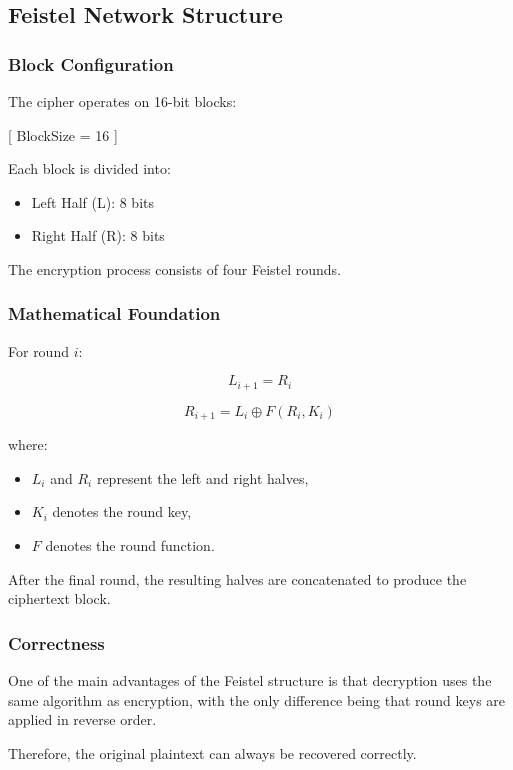 \documentclass[12pt]{article}
\begin{document}
\subsection{Feistel Network Structure}

\subsubsection{Block Configuration}

The cipher operates on 16-bit blocks:

[
BlockSize = 16 
]

Each block is divided into:

\begin{itemize}
\item Left Half (L): 8 bits
\item Right Half (R): 8 bits
\end{itemize}

The encryption process consists of four Feistel rounds.

\subsubsection{Mathematical Foundation}

For round $i$:

\[
L_{i+1}=R_i
\]

\[
R_{i+1}=L_i \oplus F(R_i,K_i)
\]

where:

\begin{itemize}
\item $L_i$ and $R_i$ represent the left and right halves,
\item $K_i$ denotes the round key,
\item $F$ denotes the round function.
\end{itemize}

After the final round, the resulting halves are concatenated to produce the ciphertext block.

\subsubsection{Correctness}

One of the main advantages of the Feistel structure is that decryption uses the same algorithm as encryption, with the only difference being that round keys are applied in reverse order.

Therefore, the original plaintext can always be recovered correctly.
\end{document}
